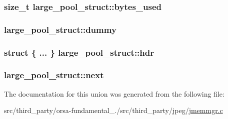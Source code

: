 \subsubsection[{bytes\+\_\+used}]{\setlength{\rightskip}{0pt plus 5cm}size\+\_\+t large\+\_\+pool\+\_\+struct\+::bytes\+\_\+used}\label{unionlarge__pool__struct_a6a809a92d1775c242eba37daabaa4b3b}
\hypertarget{unionlarge__pool__struct_a850fcb897c7fbfb12dd01193fa0c48aa}{}
\subsubsection[{dummy}]{ large\+\_\+pool\+\_\+struct\+::dummy}\label{unionlarge__pool__struct_a850fcb897c7fbfb12dd01193fa0c48aa}
\hypertarget{unionlarge__pool__struct_a92556ba164f9d34c437bd80207c2a29f}{}
\subsubsection[{hdr}]{\setlength{\rightskip}{0pt plus 5cm}struct \{ ... \}   large\+\_\+pool\+\_\+struct\+::hdr}\label{unionlarge__pool__struct_a92556ba164f9d34c437bd80207c2a29f}
\hypertarget{unionlarge__pool__struct_af4e2c26179563b175cd134ace99767cf}{}
\subsubsection[{next}]{ large\+\_\+pool\+\_\+struct\+::next}\label{unionlarge__pool__struct_af4e2c26179563b175cd134ace99767cf}


The documentation for this union was generated from the following file\+:\begin{DoxyCompactItemize}
\item 
src/third\+\_\+party/orsa-\/fundamental\+\_./src/third\+\_\+party/jpeg/\hyperlink{jmemmgr_8c}{jmemmgr.\+c}\end{DoxyCompactItemize}
